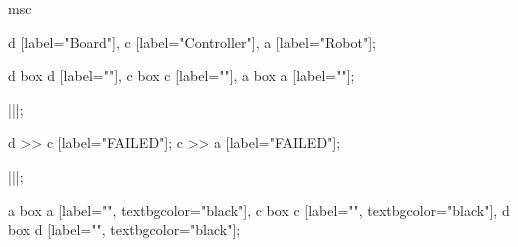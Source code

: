 \begin{msc}
msc
{

d [label="Board"],
c [label="Controller"],
a [label="Robot"];

d box d [label=""],
c box c [label=""],
a box a [label=""];


|||;

d >> c [label="FAILED"];
c >> a [label="FAILED"];

|||;

a box a [label="", textbgcolor="black"],
c box c [label="", textbgcolor="black"],
d box d [label="", textbgcolor="black"];

}
\end{msc}
